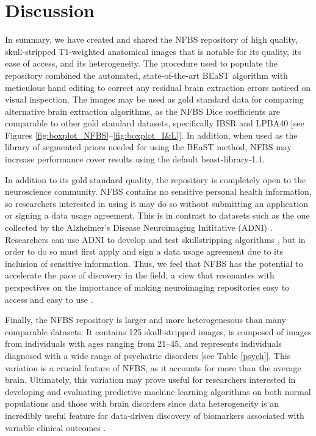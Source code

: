 \documentclass{bmcart}
\begin{document}
\section*{Discussion}
In summary, we have created and shared the NFBS repository of high quality, skull-stripped T1-weighted anatomical images that is notable for its quality, its ease of access, and its heterogeneity. The procedure used to populate the repository combined the automated, state-of-the-art BEaST algorithm with  meticulous hand editing to correct any residual brain extraction errors noticed on visual inspection. The images may be used as gold standard data for comparing alternative brain extraction algorithms, as the NFBS Dice coefficients are comparable to other gold standard datasets, specifically IBSR and LPBA40 [see Figures \ref{fig:boxplot_NFBS}--\ref{fig:boxplot_I&L}]. In addition, when used as the library of segmented priors needed for using the BEaST method, NFBS may increase performance cover results using the default beast-library-1.1. 

In addition to its gold standard quality, the repository is completely open to the neuroscience community. NFBS contains no sensitive personal health information, so researchers interested in using it may do so without submitting an application or signing a data usage agreement. This is in contrast to datasets such as the one collected by the Alzheimer's Disease Neuroimaging Inititative (ADNI) \cite{pmid17476317}. Researchers can use ADNI to develop and test skullstripping algorithms \cite{pmid21195780}, but in order to do so must first apply and sign a data usage agreement due to its inclusion of sensitive information. Thus, we feel that NFBS has the potential to accelerate the pace of discovery in the field, a view that resonantes with perspectives on the importance of making neuroimaging repositories easy to access and easy to use \cite{Nichols054262}.


Finally, the NFBS repository is larger and more heterogenesous than many comparable datasets. It contains 125 skull-stripped images, is composed of images from individuals with ages ranging from 21--45, and represents individuals diagnosed with a wide range of psychatric disorders [see Table \ref{psych}]. This variation is a crucial feature of NFBS, as it accounts for more than the average brain. Ultimately, this variation may prove useful for researchers interested in developing and evaluating predictive machine learning algorithms on both normal populations and those with brain disorders since data heterogeneity is an incredibly useful feature for data-driven discovery of biomarkers associated with variable clinical outcomes \cite{gabrieli2015prediction}.
\end{document}
